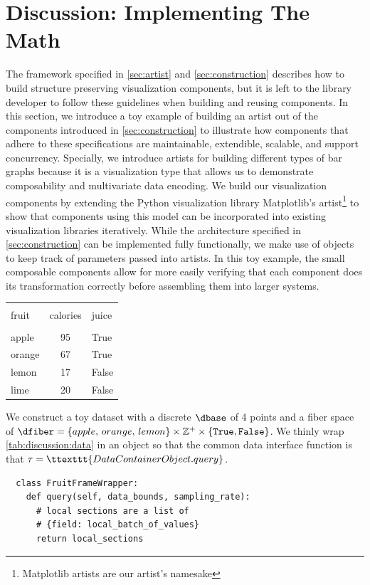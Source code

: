 \documentclass[10pt,journal,compsoc]{IEEEtran}
\theoremstyle{definition}
\theoremstyle{remark}
\begin{document}
\section{Discussion: Implementing The Math}
\label{sec:discussion}
The framework specified in \autoref{sec:artist} and \autoref{sec:construction} describes how to build structure preserving visualization components, but it is left to the library developer to follow these guidelines when building and reusing components. 
In this section, we introduce a toy example of building an artist out of the components introduced in \autoref{sec:construction} to illustrate how components that adhere to these specifications are maintainable, extendible, scalable, and support concurrency. Specially, we introduce artists for building different types of bar graphs because it is a visualization type that allows us to demonstrate composability and multivariate data encoding. We build our visualization components by extending the Python visualization library Matplotlib's artist\footnote{Matplotlib artists are our artist's namesake}\cite{hunterMatplotlib2DGraphics2007,hunterArchitectureOpenSource} to show that components using this model can be incorporated into existing visualization libraries iteratively. While the architecture specified in \autoref{sec:construction} can be implemented fully functionally, we make use of objects to keep track of parameters passed into artists. In this toy example, the small composable components allow for more easily verifying that each component does its transformation correctly before assembling them into larger systems.  


\begin{table}[h!]
  \centering
\begin{tabular}{|lcl|}
  \hline \\
   fruit &  calories &  juice \\
  \hline\\
    apple &        95 &   True \\ 
   orange &        67 &   True \\ 
  lemon &        17 &  False \\ 
      lime &        20 &  False \\
  \hline
\end{tabular}
\label{tab:discussion:data}
\end{table}
We construct a toy dataset with a discrete $\dbase$ of 4 points and a fiber space of $\dfiber=\{apple,\, orange,\, lemon\}\times \mathbb{Z}^{+} \times \{\texttt{True}, \texttt{False}\}$. We thinly wrap \autoref{tab:discussion:data} in an object so that the common data interface function is that $\tau = \ttexttt{DataContainerObject.query}$. 
\begin{verbatim}
  class FruitFrameWrapper:
    def query(self, data_bounds, sampling_rate):
      # local sections are a list of
      # {field: local_batch_of_values}
      return local_sections
\end{verbatim}
\end{document}
